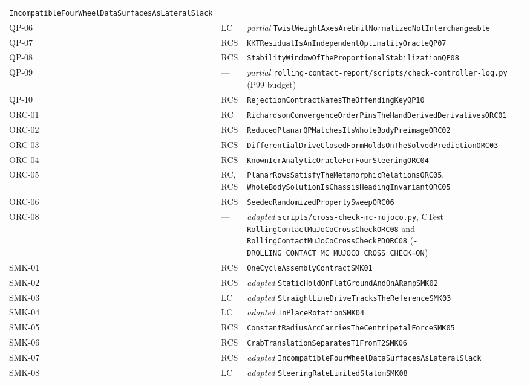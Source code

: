 \documentclass[10pt]{article}
\begin{document}
{\begin{longtable}{|l|l|p{}|}
    \texttt{IncompatibleFourWheelDataSurfacesAsLateralSlack} \\
  QP-06 & LC & \emph{partial} \texttt{TwistWeightAxesAreUnitNormalizedNotInterchangeable} \\
  QP-07 & RCS & \texttt{KKTResidualIsAnIndependentOptimalityOracleQP07} \\
  QP-08 & RCS & \texttt{StabilityWindowOfTheProportionalStabilizationQP08} \\
  QP-09 & --- & \emph{partial} \texttt{rolling-contact-report/scripts/check-controller-log.py} (P99 budget) \\
  QP-10 & RCS & \texttt{RejectionContractNamesTheOffendingKeyQP10} \\
  ORC-01 & RC & \texttt{RichardsonConvergenceOrderPinsTheHandDerivedDerivativesORC01} \\
  ORC-02 & RCS & \texttt{ReducedPlanarQPMatchesItsWholeBodyPreimageORC02} \\
  ORC-03 & RCS & \texttt{DifferentialDriveClosedFormHoldsOnTheSolvedPredictionORC03} \\
  ORC-04 & RCS & \texttt{KnownIcrAnalyticOracleForFourSteeringORC04} \\
  ORC-05 & RC, RCS & \texttt{PlanarRowsSatisfyTheMetamorphicRelationsORC05},
    \texttt{WholeBodySolutionIsChassisHeadingInvariantORC05} \\
  ORC-06 & RCS & \texttt{SeededRandomizedPropertySweepORC06} \\
  ORC-08 & --- & \emph{adapted} \texttt{scripts/cross-check-mc-mujoco.py}, CTest
    \texttt{RollingContactMuJoCoCrossCheckORC08} and
    \texttt{RollingContactMuJoCoCrossCheckPDORC08}
    (\texttt{-DROLLING\_CONTACT\_MC\_MUJOCO\_CROSS\_CHECK=ON}) \\
  SMK-01 & RCS & \texttt{OneCycleAssemblyContractSMK01} \\
  SMK-02 & RCS & \emph{adapted} \texttt{StaticHoldOnFlatGroundAndOnARampSMK02} \\
  SMK-03 & LC & \emph{adapted} \texttt{StraightLineDriveTracksTheReferenceSMK03} \\
  SMK-04 & LC & \emph{adapted} \texttt{InPlaceRotationSMK04} \\
  SMK-05 & RCS & \texttt{ConstantRadiusArcCarriesTheCentripetalForceSMK05} \\
  SMK-06 & RCS & \texttt{CrabTranslationSeparatesT1FromT2SMK06} \\
  SMK-07 & RCS & \emph{adapted} \texttt{IncompatibleFourWheelDataSurfacesAsLateralSlack} \\
  SMK-08 & LC & \emph{adapted} \texttt{SteeringRateLimitedSlalomSMK08} \\

\end{longtable}}
\end{document}
